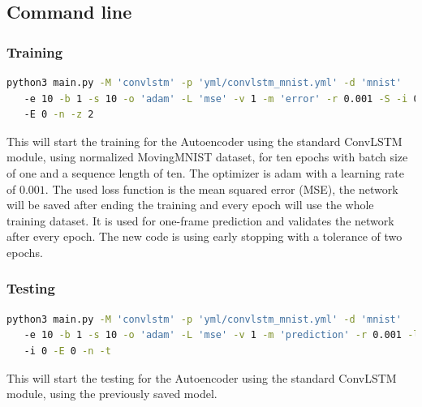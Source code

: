  \subsection*{Command line}
  \subsubsection*{Training}
   \begin{lstlisting}[language=bash]
   python3 main.py -M 'convlstm' -p 'yml/convlstm_mnist.yml' -d 'mnist'
   -e 10 -b 1 -s 10 -o 'adam' -L 'mse' -v 1 -m 'error' -r 0.001 -S -i 0
   -E 0 -n -z 2
  \end{lstlisting}\noindent
  This will start the training for the Autoencoder using the standard ConvLSTM module, using normalized MovingMNIST dataset, for ten epochs with batch size of one 
  and a sequence length of ten. The optimizer is adam with a learning rate of $0.001$. The used loss function is the mean squared error (MSE), the network will be 
  saved after ending the training and every epoch will use the whole training dataset. It is used for one-frame prediction and validates the network after every 
  epoch. The new code is using early stopping with a tolerance of two epochs.
  \subsubsection*{Testing}
   \begin{lstlisting}[language=bash]
   python3 main.py -M 'convlstm' -p 'yml/convlstm_mnist.yml' -d 'mnist'
   -e 10 -b 1 -s 10 -o 'adam' -L 'mse' -v 1 -m 'prediction' -r 0.001 -l
   -i 0 -E 0 -n -t
  \end{lstlisting}\noindent
  This will start the testing for the Autoencoder using the standard ConvLSTM module, using the previously saved model.